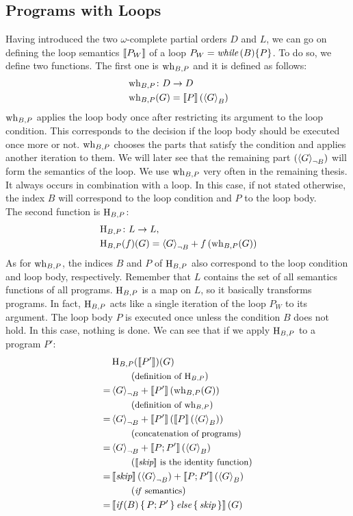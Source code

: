 \subsection{Programs with Loops}
\label{sec:loop_semantics}
Having introduced the two $\omega$-complete partial orders $D$ and $L$, we can go on defining the loop semantics $\smtx{P_W}$ of a loop $P_W = \while{B}{P}$.
To do so, we define two functions.
The first one is $\wh$ and it is defined as follows:
\begin{align*}
	& \wh \colon D \to D \\
	& \wh(G) = \smtx{P}(\resP{G}) \\
\end{align*}
$\wh$ applies the loop body once after restricting its argument to the loop condition.
This corresponds to the decision if the loop body should be executed once more or not.
$\wh$ chooses the parts that satisfy the condition and applies another iteration to them.
We will later see that the remaining part $(\resN{G})$ will form the semantics of the loop.
We use $\wh$ very often in the remaining thesis.
It always occurs in combination with a loop.
In this case, if not stated otherwise, the index $B$ will correspond to the loop condition and $P$ to the loop body. \\
The second function is $\hh$:
\begin{align*}
	& \hh \colon L \to L, \\
	& \hh(f)(G) = \resN{G} + f \l( \wh(G) \r)
\end{align*}
As for $\wh$, the indices $B$ and $P$ of $\hh$ also correspond to the loop condition and loop body, respectively.
Remember that $L$ contains the set of all semantics functions of all programs.
$\hh$ is a map on $L$, so it basically transforms programs.
In fact, $\hh$ acts like a single iteration of the loop $P_W$ to its argument.
The loop body $P$ is executed once unless the condition $B$ does not hold.
In this case, nothing is done.
We can see that if we apply $\hh$ to a program $P'$:
\begin{align*}
	 & \hh( \smtx{P'} )(G) \\
	 & \explain{definition of $\hh$} \\
	=& \resN{G} + \smtx{P'} \l( \wh(G) \r) \\
	 & \explain{definition of $\wh$} \\
	=& \resN{G} + \smtx{P'} \l( \smtx{P} \l( \resP{G} \r) \r) \\
	 & \explain{concatenation of programs} \\
	=& \resN{G} + \smtx{P; P'}( \resP{G} ) \\
	 & \explain{$\smtx{\nop}$ is the identity function} \\
	=& \smtx{\nop}( \resN{G} ) + \smtx{P; P'}( \resP{G} ) \\
	 & \explain{\textit{if} semantics} \\
	=& \smtx{ \ifp{B}{P; P'}{\nop} }(G)
\end{align*}

